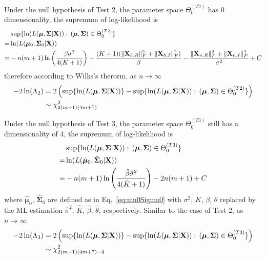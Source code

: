 \documentclass[journal,draftcls,onecolumn,12pt,twoside]{IEEEtran}
\begin{document}
Under the null hypothesis of Test 2, the parameter space $\Theta_0^{(T2)}$ has 0
dimensionality, the supremum of log-likelihood is
\begin{align}
  & \sup \{\ln(L(\bm{\mu}, \mathbf{\Sigma}|\mathbf{X})):\,(\bm{\mu},
  \mathbf{\Sigma})\in \Theta_0^{(T2)}\} \notag \\
  = & \ln(L(\bm{\mu}_0,
  \mathbf{\Sigma}_0|\mathbf{X})) \notag \\
  = & -n(m+1)
  \ln\left(\frac{\beta \sigma^2}{4(K+1)}\right) -
  \frac{(K+1)(\|\mathbf{X}_{h,R}\|_F^2 + \|\mathbf{X}_{h,I}\|_F^2)}{\beta} -
  \frac{\|\mathbf{X}_{n,R}\|_F^2 + \|\mathbf{X}_{n,I}\|_F^2}{\sigma^2}
  + C
\end{align}
therefore according to Wilks's therorm, as $n\rightarrow\infty$ 
\begin{align}
  -2\ln(\Lambda_2) &= 2\left(\sup \{\ln(L(\bm{\mu},
  \mathbf{\Sigma}|\mathbf{X}))\} - \sup \{\ln(L(\bm{\mu}, \mathbf{\Sigma}|\mathbf{X})):\,(\bm{\mu},
  \mathbf{\Sigma})\in \Theta_0^{(T2)}\}\right) \notag \\
  &\sim \chi_{2(m+1)(4m+7)}^2
\end{align}

Under the null hypothesis of Test 3, the parameter space $\Theta_0^{(T3)}$ still
has a dimensionality of 4, the supremum of log-likelihood is
\begin{align}
  & \sup \{\ln(L(\bm{\mu}, \mathbf{\Sigma}|\mathbf{X})):\,(\bm{\mu},
  \mathbf{\Sigma})\in \Theta_0^{(T3)}\} \notag \\
  = & \ln(L(\hat{\bm{\mu}}_0,
  \hat{\mathbf{\Sigma}}_0|\mathbf{X})) \notag \\
  = & -n(m+1)\ln\left(\frac{\hat{\beta} \hat{\sigma}^2} {4(\hat{K}+1)}\right) -
    2n(m+1) + C
\end{align}
where $\hat{\bm{\mu}}_0 $, $\hat{\mathbf{\Sigma}}_0 $ are defined as in
Eq.~\eqref{eq:mu0Sigma0} with $\sigma^2$, $K$, $\beta$, $\theta$ replaced by
the ML estimation $\hat{\sigma}^2$, $\hat{K}$,
$\hat{\beta}$, $\hat{\theta}$, respectively. Similar to the case of Test 2,
as $n\rightarrow\infty$
\begin{align}
  -2\ln(\Lambda_3) &= 2\left(\sup \{\ln(L(\bm{\mu},
  \mathbf{\Sigma}|\mathbf{X}))\} - \sup \{\ln(L(\bm{\mu}, \mathbf{\Sigma}|\mathbf{X})):\,(\bm{\mu},
  \mathbf{\Sigma})\in \Theta_0^{(T3)}\}\right) \notag \\
  &\sim \chi_{2(m+1)(4m+7) - 4}^2
\end{align}




\end{document}
